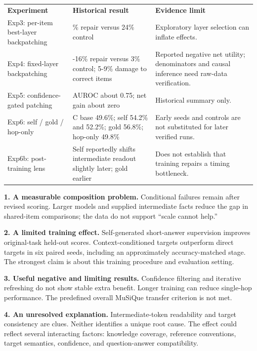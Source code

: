 \documentclass[11pt,a4paper]{article}
\newcommand{\reportheading}[1]{\par\vspace{5pt}{\color{teal}\bfseries\large #1}\par\vspace{2pt}}
\begin{document}
{\small
\begin{tabular}{>{\raggedright\arraybackslash}p{}>{\raggedright\arraybackslash}p{}>{\raggedright\arraybackslash}p{}}
\rowcolor{navy}
\color{white}\bfseries Experiment & \color{white}\bfseries Historical result & \color{white}\bfseries Evidence limit \\
\rowcolor{pale}
Exp3: per-item best-layer backpatching & 37\% repair versus 24\% control & Exploratory layer selection can inflate effects. \\
Exp4: fixed-layer backpatching & 14-16\% repair versus 3\% control; 5-9\% damage to correct items & Reported negative net utility; denominators and causal inference need raw-data verification. \\
\rowcolor{pale}
Exp5: confidence-gated patching & AUROC about 0.75; net gain about zero & Historical summary only. \\
Exp6: self / gold / hop-only & C base 49.6\%; self 54.2\% and 52.2\%; gold 56.8\%; hop-only 49.8\% & Early seeds and controls are not substituted for later verified runs. \\
\rowcolor{pale}
Exp6b: post-training lens & Self reportedly shifts intermediate readout slightly later; gold earlier & Does not establish that training repairs a timing bottleneck. \\
\end{tabular}
}\par\smallskip
\reportheading{What the completed evidence supports}
\textbf{1. A measurable composition problem.} Conditional failures remain after revised scoring. Larger models and supplied intermediate facts reduce the gap in shared-item comparisons; the data do not support ``scale cannot help.''

\textbf{2. A limited training effect.} Self-generated short-answer supervision improves original-task held-out scores. Context-conditioned targets outperform direct targets in six paired seeds, including an approximately accuracy-matched stage. The strongest claim is about this training procedure and evaluation setting.

\textbf{3. Useful negative and limiting results.} Confidence filtering and iterative refreshing do not show stable extra benefit. Longer training can reduce single-hop performance. The predefined overall MuSiQue transfer criterion is not met.

\textbf{4. An unresolved explanation.} Intermediate-token readability and target consistency are clues. Neither identifies a unique root cause. The effect could reflect several interacting factors: knowledge coverage, reference conventions, target semantics, confidence, and question-answer compatibility.
\end{document}

